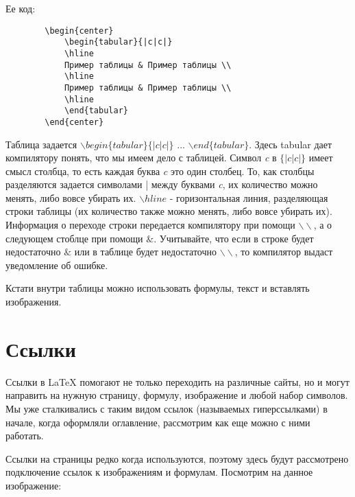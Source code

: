    \vspace{0.5cm}
    
    Ее код:    
    
    \begin{verbatim}
        \begin{center}
            \begin{tabular}{|c|c|}
            \hline 
            Пример таблицы & Пример таблицы \\ 
            \hline 
            Пример таблицы & Пример таблицы \\ 
            \hline 
            \end{tabular}
        \end{center}
    \end{verbatim}
    
    Таблица задается $\backslash begin\{tabular\}\{|c|c|\}$ ... $\backslash end\{tabular\}$. Здесь tabular дает компилятору понять, что мы имеем дело с таблицей. Символ \textit{c} в $\{|c|c|\}$ имеет смысл столбца, то есть каждая буква \textit{c} это один столбец. То, как столбцы разделяются задается символами | между буквами \textit{c}, их количество можно менять, либо вовсе убирать их. $\backslash hline$ - горизонтальная линия, разделяющая строки таблицы (их количество также можно менять, либо вовсе убирать их). Информация о переходе строки передается компилятору при помощи $\backslash \backslash$, а о следующем стоблце при помощи $\&$. Учитывайте, что если в строке будет недостаточно $\&$ или в таблице будет недостаточно $\backslash \backslash$, то компилятор выдаст уведомление об ошибке.
    
    Кстати внутри таблицы можно использовать формулы, текст и вставлять изображения.
    
    \section{Ссылки}

    Ссылки в \LaTeX{} помогают не только переходить на различные сайты, но и могут направить на нужную страницу, формулу, изображение и любой набор символов. Мы уже сталкивались с таким видом ссылок (называемых гиперссылками) в начале, когда оформляли оглавление, рассмотрим как еще можно с ними работать.
    
    Ссылки на страницы редко когда используются, поэтому здесь будут рассмотрено подключение ссылок к изображениям и формулам. Посмотрим на данное изображение:

    \newpage    
    
